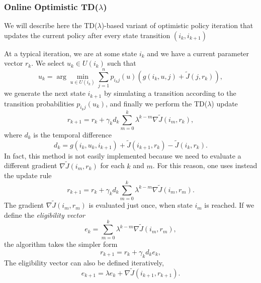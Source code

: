 \subsubsection*{Online Optimistic TD($\lambda$)}
We will describe here the TD($\lambda$)-based variant of optimistic policy iteration that updates the current policy after every state transition $(i_k,i_{k+1})$

At a typical iteration, we are at some state $i_k$ and we have a current parameter vector $r_k$. We select $u_k \in U(i_k)$ such that
\begin{equation} \label{equ:optimistic:uk}
u_k = \arg \min_{u \in U(i_k)} \sum_{j=1}^n p_{i_kj}(u) \left( g(i_k,u,j) + \tilde J(j,r_k) \right),
\end{equation}
we generate the next state $i_{k+1}$ by simulating a transition according to the transition probabilities $p_{i_kj}(u_k)$, and finally we perform the TD($\lambda$) update
$$r_{k+1} = r_k + \gamma_k d_k \sum_{m=0}^k \lambda^{k-m} \nabla \tilde J(i_m, r_k),$$
where $d_k$ is the temporal difference 
\begin{equation} \label{eq:optimistic:d_k}
d_k = g(i_k,u_k,i_{k+1}) + \tilde J(i_{k+1},r_k) - \tilde J(i_k,r_k).
\end{equation}
In fact, this method is not easily implemented because we need to evaluate a different gradient $\nabla \tilde J(i_m,r_k)$ for each $k$ and $m$. For this reason, one uses instead the update rule
\begin{equation} \label{eq:optimistic:online0}
r_{k+1} = r_k + \gamma_k d_k \sum_{m=0}^k \lambda^{k-m} \nabla \tilde J(i_m,r_m).
\end{equation}
The gradient $\nabla \tilde J(i_m,r_m)$ is evaluated just once, when state $i_m$ is reached. If we define the \emph{eligibility vector}
\begin{equation} \label{eq:optimistic:online1}
e_k = \sum_{m=0}^k \lambda^{k-m} \nabla \tilde J(i_m,r_m),
\end{equation}
the algorithm takes the simpler form 
\begin{equation} \label{eq:optimistic:online2}
r_{k+1} = r_k + \gamma_k d_k e_k,
\end{equation}
The eligibility vector can also be defined iteratively,  
\begin{equation} \label{eq:optimistic:online3}
e_{k+1} = \lambda e_k + \nabla \tilde J(i_{k+1},r_{k+1}).
\end{equation}

